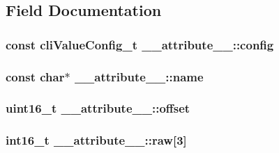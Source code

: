 \subsection{Field Documentation}
\hypertarget{struct____attribute_____a6ab60051a05ff8847ba000ce85d076e7}{
\subsubsection[{config}]{\setlength{\rightskip}{0pt plus 5cm}const {\bf cli\+Value\+Config\+\_\+t} \+\_\+\+\_\+attribute\+\_\+\+\_\+\+::config}}\label{struct____attribute_____a6ab60051a05ff8847ba000ce85d076e7}
\hypertarget{struct____attribute_____a0d8e8bda3b9ea78615345402ce1b986a}{
\subsubsection[{name}]{\setlength{\rightskip}{0pt plus 5cm}const char$\ast$ \+\_\+\+\_\+attribute\+\_\+\+\_\+\+::name}}\label{struct____attribute_____a0d8e8bda3b9ea78615345402ce1b986a}
\hypertarget{struct____attribute_____ab1cb1c783cfc8f8eac63ab1c5a834c73}{
\subsubsection[{offset}]{\setlength{\rightskip}{0pt plus 5cm}uint16\+\_\+t \+\_\+\+\_\+attribute\+\_\+\+\_\+\+::offset}}\label{struct____attribute_____ab1cb1c783cfc8f8eac63ab1c5a834c73}
\hypertarget{struct____attribute_____a70ca0654a1cfdb92a7620f63cb22790d}{
\subsubsection[{raw}]{\setlength{\rightskip}{0pt plus 5cm}int16\+\_\+t \+\_\+\+\_\+attribute\+\_\+\+\_\+\+::raw\mbox{[}3\mbox{]}}}\label{struct____attribute_____a70ca0654a1cfdb92a7620f63cb22790d}
